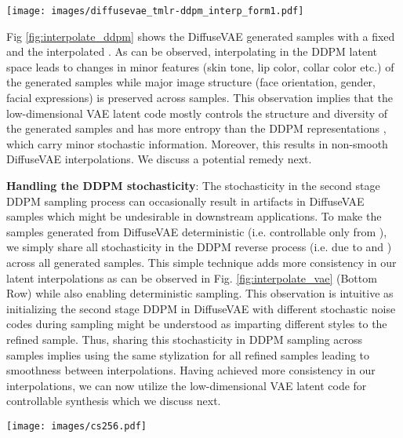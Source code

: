 \documentclass[10pt]{article} \usepackage[accepted]{tmlr}
\begin{document}
\begin{figure*}
  \centering
    \texttt{[image: images/diffusevae\_tmlr-ddpm\_interp\_form1.pdf]}
    \caption{DiffuseVAE samples generated by linearly interpolating in the  latent space (Formulation-1, T=1000).  denotes the interpolation factor.}
    \label{fig:interpolate_ddpm}
\end{figure*}

Fig \ref{fig:interpolate_ddpm} shows the DiffuseVAE generated samples with a fixed  and the interpolated . As can be observed, interpolating in the DDPM latent space leads to changes in minor features (skin tone, lip color, collar color etc.) of the generated samples while major image structure (face orientation, gender, facial expressions) is preserved across samples. This observation implies that the low-dimensional VAE latent code mostly controls the structure and diversity of the generated samples and has more entropy than the DDPM representations , which carry minor stochastic information. Moreover, this results in non-smooth DiffuseVAE interpolations. We discuss a potential remedy next.

\textbf{Handling the DDPM stochasticity}:
The stochasticity in the second stage DDPM sampling process can occasionally result in artifacts in DiffuseVAE samples which might be undesirable in downstream applications. To make the samples generated from DiffuseVAE deterministic (i.e. controllable only from ), we simply share all stochasticity in the DDPM reverse process (i.e. due to  and ) across all generated samples. This simple technique adds more consistency in our latent interpolations as can be observed in Fig. \ref{fig:interpolate_vae} (Bottom Row) while also enabling deterministic sampling. This observation is intuitive as initializing the second stage DDPM in DiffuseVAE with different stochastic noise codes during sampling might be understood as imparting different styles to the refined sample. Thus, sharing this stochasticity in DDPM sampling across samples implies using the same stylization for all refined samples leading to smoothness between interpolations. Having achieved more consistency in our interpolations, we can now utilize the low-dimensional VAE latent code for controllable synthesis which we discuss next.

\begin{figure*}
  \centering
    \texttt{[image: images/cs256.pdf]}
    \caption{Controllable generation on DiffuseVAE generated samples on the CelebA-HQ 256 dataset. Red and green arrows indicate vector subtract and addition operations respectively. Top and Bottom panels show single edits and composite edits respectively.}
    \label{fig:cs256}
\end{figure*}
\end{document}
